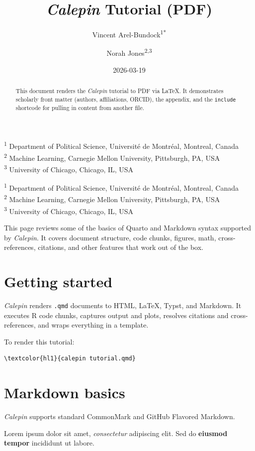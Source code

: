 \documentclass[11pt]{article}
\title{\emph{Calepin} Tutorial (PDF)}
\author{Vincent Arel-Bundock\textsuperscript{1}\textsuperscript{*} \and Norah Jones\textsuperscript{2,3}}
\date{2026-03-19}
\newcommand{\affiliationblock}{\begin{center}\small \textsuperscript{1} Department of Political Science, Université de Montréal, Montreal, Canada \\
\textsuperscript{2} Machine Learning, Carnegie Mellon University, Pittsburgh, PA, USA \\
\textsuperscript{3} University of Chicago, Chicago, IL, USA\end{center}}
\begin{document}
\maketitle
\ifdefined\affiliationblock\affiliationblock\fi


\begin{abstract}
This document renders the \emph{Calepin} tutorial to PDF via LaTeX. It demonstrates
scholarly front matter (authors, affiliations, ORCID), the appendix, and the
\texttt{include} shortcode for pulling in content from another file.
\end{abstract}



This page reviews some of the basics of Quarto and Markdown syntax supported by \emph{Calepin}. It covers document structure, code chunks, figures, math, cross-references, citations, and other features that work out of the box.

\section*{Getting started}
\label{getting-started}

\emph{Calepin} renders \texttt{.qmd} documents to HTML, LaTeX, Typst, and Markdown. It executes R code chunks, captures output and plots, resolves citations and cross-references, and wraps everything in a template.

To render this tutorial:



\begin{srccode}
\begin{Verbatim}[commandchars=\\\{\}]
\textcolor{hl1}{calepin tutorial.qmd}
\end{Verbatim}
\end{srccode}

\section*{Markdown basics}
\label{markdown-basics}

\emph{Calepin} supports standard CommonMark and GitHub Flavored Markdown.

Lorem ipsum dolor sit amet, \emph{consectetur} adipiscing elit.
Sed do \textbf{eiusmod tempor} incididunt ut labore.
\end{document}
